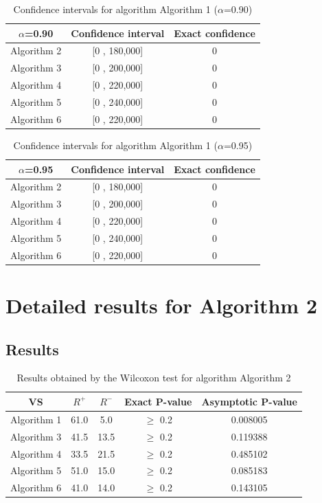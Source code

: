 \documentclass[a4paper,10pt]{article}
\begin{document}
\begin{table}[!htp]
\centering\small
\begin{tabular}{
|c|c|c|}
\hline
 $\alpha$=0.90 & Confidence interval & Exact confidence \\ \hline 
Algorithm 2 & [0 , 180,000] & 0\\ \hline 
Algorithm 3 & [0 , 200,000] & 0\\ \hline 
Algorithm 4 & [0 , 220,000] & 0\\ \hline 
Algorithm 5 & [0 , 240,000] & 0\\ \hline 
Algorithm 6 & [0 , 220,000] & 0\\ \hline 

\end{tabular}
\caption{Confidence intervals for algorithm Algorithm 1 ($\alpha$=0.90)}
\end{table}
\begin{table}[!htp]
\centering\small
\begin{tabular}{
|c|c|c|}
\hline
 $\alpha$=0.95 & Confidence interval & Exact confidence \\ \hline 
Algorithm 2 & [0 , 180,000] & 0\\ \hline 
Algorithm 3 & [0 , 200,000] & 0\\ \hline 
Algorithm 4 & [0 , 220,000] & 0\\ \hline 
Algorithm 5 & [0 , 240,000] & 0\\ \hline 
Algorithm 6 & [0 , 220,000] & 0\\ \hline 

\end{tabular}
\caption{Confidence intervals for algorithm Algorithm 1 ($\alpha$=0.95)}
\end{table}

 \clearpage 


\section{Detailed results for Algorithm 2}


\subsection{Results}

\begin{table}[!htp]
\centering\small
\begin{tabular}{
|c|c|c|c|c|}
\hline
 VS & $R^{+}$ & $R^{-}$ & Exact P-value & Asymptotic P-value \\ \hline 
Algorithm 1 & 61.0 & 5.0 & $\geq$ 0.2 & 0.008005\\ \hline 
Algorithm 3 & 41.5 & 13.5 & $\geq$ 0.2 & 0.119388\\ \hline 
Algorithm 4 & 33.5 & 21.5 & $\geq$ 0.2 & 0.485102\\ \hline 
Algorithm 5 & 51.0 & 15.0 & $\geq$ 0.2 & 0.085183\\ \hline 
Algorithm 6 & 41.0 & 14.0 & $\geq$ 0.2 & 0.143105\\ \hline 

\end{tabular}
\caption{Results obtained by the Wilcoxon test for algorithm Algorithm 2}
\end{table}
\end{document}
